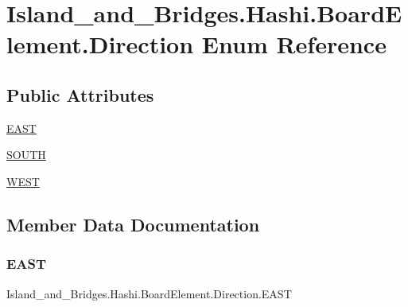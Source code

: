 \hypertarget{enum_island__and___bridges_1_1_hashi_1_1_board_element_1_1_direction}{}\section{Island\+\_\+and\+\_\+\+Bridges.\+Hashi.\+Board\+Element.\+Direction Enum Reference}
\label{enum_island__and___bridges_1_1_hashi_1_1_board_element_1_1_direction}
\subsection*{Public Attributes}
\begin{DoxyCompactItemize}
\item 
\mbox{\hyperlink{enum_island__and___bridges_1_1_hashi_1_1_board_element_1_1_direction_abe7372f99318707f75c07254f194d911}{E\+A\+ST}}
\item 
\mbox{\hyperlink{enum_island__and___bridges_1_1_hashi_1_1_board_element_1_1_direction_a1f9b870cfe7dc61dfacb55eeeb0d0700}{S\+O\+U\+TH}}
\item 
\mbox{\hyperlink{enum_island__and___bridges_1_1_hashi_1_1_board_element_1_1_direction_a568de614d4fbef6963811326bf301382}{W\+E\+ST}}
\end{DoxyCompactItemize}


\subsection{Member Data Documentation}
\mbox{\label{enum_island__and___bridges_1_1_hashi_1_1_board_element_1_1_direction_abe7372f99318707f75c07254f194d911}} 
\subsubsection{\texorpdfstring{E\+A\+ST}{EAST}}
{\footnotesize\ttfamily Island\+\_\+and\+\_\+\+Bridges.\+Hashi.\+Board\+Element.\+Direction.\+E\+A\+ST}

